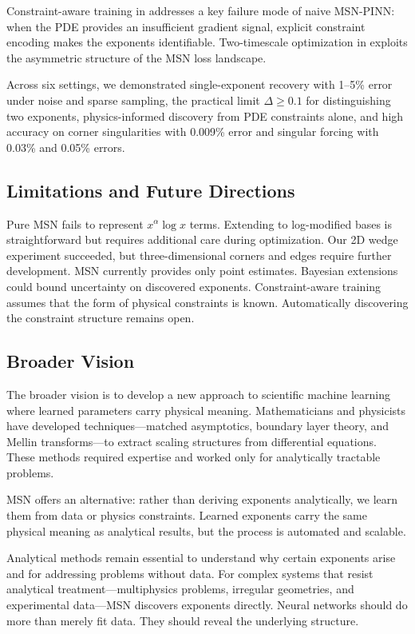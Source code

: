 \documentclass{article}
\theoremstyle{plain}
\theoremstyle{definition}
\theoremstyle{remark}
\begin{document}
Constraint-aware training in  addresses a key failure mode of naive MSN-PINN: when the PDE provides an insufficient gradient signal, explicit constraint encoding makes the exponents identifiable. Two-timescale optimization in  exploits the asymmetric structure of the MSN loss landscape.

Across six settings, we demonstrated single-exponent recovery with 1--5\% error under noise and sparse sampling, the practical limit $\Delta \geq 0.1$ for distinguishing two exponents, physics-informed discovery from PDE constraints alone, and high accuracy on corner singularities with 0.009\% error and singular forcing with 0.03\% and 0.05\% errors.

\subsection{Limitations and Future Directions}

Pure MSN fails to represent $x^\alpha \log x$ terms. Extending to log-modified bases is straightforward but requires additional care during optimization. Our 2D wedge experiment succeeded, but three-dimensional corners and edges require further development. MSN currently provides only point estimates. Bayesian extensions could bound uncertainty on discovered exponents. Constraint-aware training assumes that the form of physical constraints is known. Automatically discovering the constraint structure remains open.

\subsection{Broader Vision}

The broader vision is to develop a new approach to scientific machine learning where learned parameters carry physical meaning. Mathematicians and physicists have developed techniques---matched asymptotics, boundary layer theory, and Mellin transforms---to extract scaling structures from differential equations. These methods required expertise and worked only for analytically tractable problems.

MSN offers an alternative: rather than deriving exponents analytically, we learn them from data or physics constraints. Learned exponents carry the same physical meaning as analytical results, but the process is automated and scalable.

Analytical methods remain essential to understand why certain exponents arise and for addressing problems without data. For complex systems that resist analytical treatment---multiphysics problems, irregular geometries, and experimental data---MSN discovers exponents directly. Neural networks should do more than merely fit data. They should reveal the underlying structure.
\end{document}
